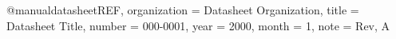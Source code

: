 @manual{datasheetREF,
    organization  = {Datasheet Organization},
    title         = {Datasheet Title},
    number        = {000-0001},
    year          = {2000},
    month         = {1},    
    note          = {Rev, A}
}
